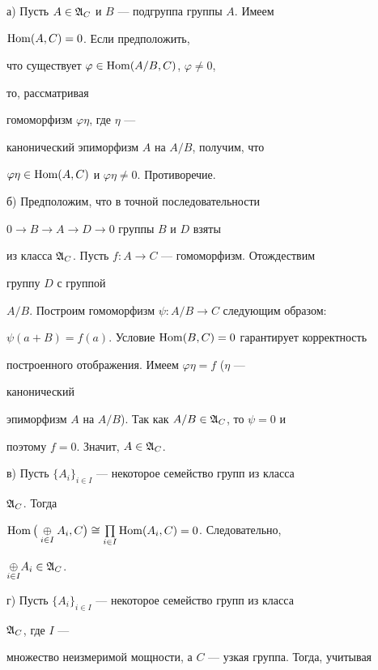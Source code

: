  


\begin{pf} 


а) Пусть $A\in\frak A_C$ и $B$ --- подгруппа группы $A$. Имеем 


$\operatorname{Hom}(A,C)=0$. Если предположить, 


что существует $\varphi\in\operatorname{Hom}(A/B,C)$, $\varphi\ne 0$, 


то, рассматривая 


гомоморфизм $\varphi\eta$, где $\eta$ --- 


канонический эпиморфизм $A$ на $A/B$, получим, что 


$\varphi\eta\in\operatorname{Hom}(A,C)$ и $\varphi\eta\ne 0$. Противоречие. 


 


б) Предположим, что в точной последовательности 


$0\to B\to A\to D\to 0$ группы $B$ и $D$ взяты 


из класса $\frak A_C$. Пусть $f:A\to C$ --- гомоморфизм. Отождествим 


группу $D$ с группой 


$A/B$. Построим гомоморфизм $\psi:A/B\to C$ следующим образом: 


$\psi(a+B)=f(a)$. Условие $\operatorname{Hom}(B,C)=0$ гарантирует корректность 


построенного отображения. Имеем $\varphi\eta=f$ ($\eta$ --- 


канонический 


эпиморфизм $A$ на $A/B$). Так как $A/B\in\frak A_C$, то $\psi=0$ и 


поэтому $f=0$. Значит, $A\in\frak A_C$. 


 


в) Пусть $\{A_i\}_{i\in I}$ --- некоторое семейство групп из класса 


$\frak A_C$. Тогда 


$\Hom\big(\underset{i\in I}{\oplus}{}A_i,C\big)\cong 


\prod\limits_{i\in I}\Hom(A_i,C)=0$. Следовательно, 


$\underset{i\in I}{\oplus}{}A_i\in\frak A_C$. 


 


г) Пусть $\{A_i\}_{i\in I}$ --- некоторое семейство групп из класса 


$\frak A_C$, где $I$ --- 


множество неизмеримой мощности, а $C$ --- узкая группа. Тогда, учитывая 



\end{pf}

